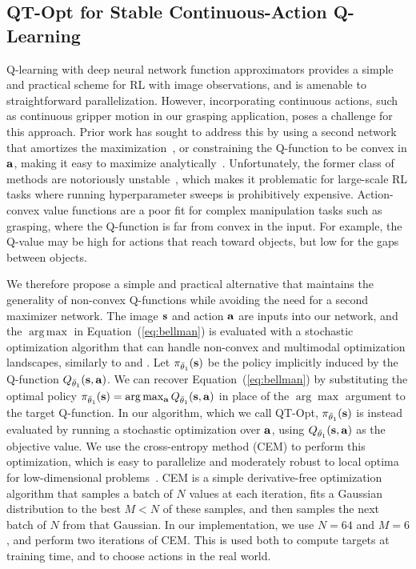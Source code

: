 \documentclass{article}
\DeclareMathOperator*{\argmax}{arg\,max}
\begin{document}
\subsection{QT-Opt for Stable Continuous-Action Q-Learning}
\label{sec:qtopt-details}

Q-learning with deep neural network function approximators provides a simple and practical scheme for RL with image observations, and is amenable to straightforward parallelization. However, incorporating continuous actions, such as continuous gripper motion in our grasping application, poses a challenge for this approach. Prior work has sought to address this by using a second network that amortizes the maximization~\citep{hafner11,lillicrap15}, or constraining the Q-function to be convex in $\mathbf{a}$, making it easy to maximize analytically~\citep{gu16,amos2017icnn}. Unfortunately, the former class of methods are notoriously unstable~\citep{deeprlthatmatters17}, which makes it problematic for large-scale RL tasks where running hyperparameter sweeps is prohibitively expensive. Action-convex value functions are a poor fit for complex manipulation tasks such as grasping, where the Q-function is far from convex in the input. For example, the Q-value may be high for actions that reach toward objects, but low for the gaps between objects.

We therefore propose a simple and practical alternative that maintains the generality of non-convex Q-functions while avoiding the need for a second maximizer network. The image $\mathbf{s}$ and action $\mathbf{a}$ are inputs into our network, and the $\argmax$ in Equation~(\ref{eq:bellman}) is evaluated with a stochastic optimization algorithm that can handle non-convex and multimodal optimization landscapes, similarly to \citep{gcg} and \citep{quillen}. Let $\pi_{\bar{\theta}_1}(\mathbf{s})$ be the policy implicitly induced by the Q-function $Q_{\bar{\theta}_1}(\mathbf{s},\mathbf{a})$. We can recover Equation~(\ref{eq:bellman}) by substituting the optimal policy $\pi_{\bar{\theta}_1}(\mathbf{s}) = \arg\max_{\mathbf{a}} Q_{\bar{\theta}_1}(\mathbf{s},\mathbf{a})$ in place of the $\arg\max$ argument to the target Q-function. In our algorithm, which we call QT-Opt, $\pi_{\bar{\theta}_1}(\mathbf{s})$ is instead evaluated by running a stochastic optimization over $\mathbf{a}$, using $Q_{\bar{\theta}_1}(\mathbf{s},\mathbf{a})$ as the objective value. We use the cross-entropy method (CEM) to perform this optimization, which is easy to parallelize and moderately robust to local optima for low-dimensional problems~\citep{rk-cem-04}. CEM is a simple derivative-free optimization algorithm that samples a batch of $N$ values at each iteration, fits a Gaussian distribution to the best \(M < N\) of these samples, and then samples the next batch of \(N\) from that Gaussian. In our implementation, we use \(N=64\) and \(M=6\), and perform two iterations of CEM. This is used both to compute targets at training time, and to choose actions in the real world.
\end{document}
